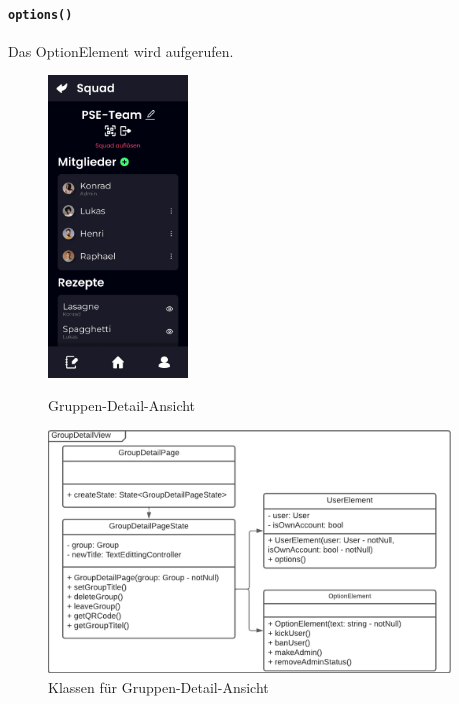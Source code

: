 \documentclass[parskip=full]{scrartcl}
\begin{document}
            \paragraph*{\texttt{options()}} Das OptionElement wird aufgerufen.

        \begin{figure}[htp]
            \begin{minipage}
                [t]{0.49\textwidth}
                \centering
                \includegraphics[height=80mm]{images/Presentation-layer/GroupDetailView.jpg}
                \caption{Gruppen-Detail-Ansicht}
            \end{minipage}
            \begin{minipage}
                [t]{0.49\textwidth}
                \centering
                \includegraphics[width=0.95\textwidth]{images/Presentation-layer/GroupDetailViewClass.pdf}
                \caption{Klassen für Gruppen-Detail-Ansicht}
            \end{minipage}
        \end{figure}    
\end{document}
